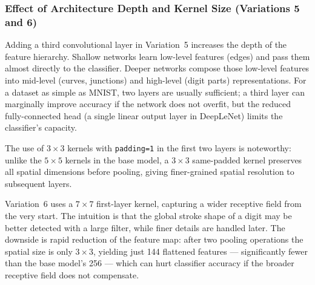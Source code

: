 \documentclass[12pt, a4paper]{article}
\begin{document}

\subsubsection{Effect of Architecture Depth and Kernel Size (Variations 5 and 6)}

Adding a third convolutional layer in Variation~5 increases the depth of the feature
hierarchy. Shallow networks learn low-level features (edges) and pass them almost
directly to the classifier. Deeper networks compose those low-level features into
mid-level (curves, junctions) and high-level (digit parts) representations. For a
dataset as simple as MNIST, two layers are usually sufficient; a third layer can
marginally improve accuracy if the network does not overfit, but the reduced
fully-connected head (a single linear output layer in DeepLeNet) limits the
classifier's capacity.

The use of $3\times3$ kernels with \texttt{padding=1} in the first two layers is
noteworthy: unlike the $5\times5$ kernels in the base model, a $3\times3$ same-padded
kernel preserves all spatial dimensions before pooling, giving finer-grained spatial
resolution to subsequent layers.

Variation~6 uses a $7\times7$ first-layer kernel, capturing a wider receptive field
from the very start. The intuition is that the global stroke shape of a digit may be
better detected with a large filter, while finer details are handled later. The
downside is rapid reduction of the feature map: after two pooling operations the
spatial size is only $3\times3$, yielding just 144 flattened features --- significantly
fewer than the base model's 256 --- which can hurt classifier accuracy if the broader
receptive field does not compensate.



\newpage
\end{document}
